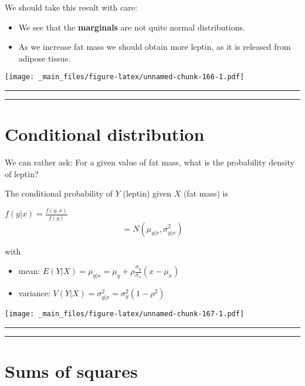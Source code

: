\documentclass[
]{book}
\providecommand{\tightlist}{%
  \setlength{\itemsep}{0pt}\setlength{\parskip}{0pt}}
\begin{document}
We should take this result with care:

\begin{itemize}
\tightlist
\item
  We see that the \textbf{marginals} are not quite normal distributions.
\item
  As we increase fat mass we should obtain more leptin, as it is released from adipose tissue.
\end{itemize}

\texttt{[image: \_main\_files/figure-latex/unnamed-chunk-166-1.pdf]}

\begin{center}\rule{0.5\linewidth}{0.5pt}\end{center}

\begin{center}\rule{0.5\linewidth}{0.5pt}\end{center}

\hypertarget{conditional-distribution}{%
\section{Conditional distribution}\label{conditional-distribution}}

We can rather ask: For a given value of fat mass, what is the probability density of leptin?

The conditional probability of \(Y\) (leptin) given \(X\) (fat mass) is

\(f(y|x)=\frac{f(y,x)}{f(y)}\)
\[=N(\mu_{y|x}, \sigma^2_{y|x})\]

with

\begin{itemize}
\item
  mean: \(E(Y|X)=\mu_{y|x}=\mu_y+\rho\frac{\sigma_y}{\sigma_x}(x-\mu_x)\)
\item
  variance: \(V(Y|X)=\sigma^2_{y|x}= \sigma_y^2(1-\rho^2)\)
\end{itemize}

\texttt{[image: \_main\_files/figure-latex/unnamed-chunk-167-1.pdf]}

\begin{center}\rule{0.5\linewidth}{0.5pt}\end{center}

\begin{center}\rule{0.5\linewidth}{0.5pt}\end{center}

\hypertarget{sums-of-squares}{%
\section{Sums of squares}\label{sums-of-squares}}
\end{document}
